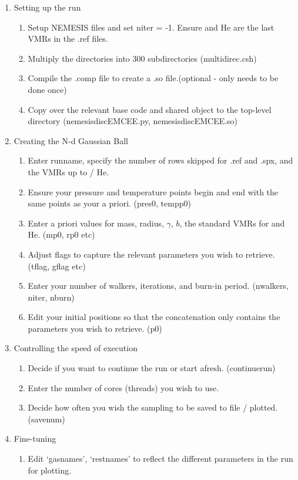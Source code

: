 \documentclass[11pt, a4paper,titlepage]{report}
\begin{document}
\begin{enumerate}
\item Setting up the run
\begin{enumerate}
\item Setup NEMESIS files and set niter = -1. Ensure  and He are the last VMRs in the .ref files.
\item Multiply the directories into 300 subdirectories (multidirec.csh)
\item Compile the .comp file to create a .so file.(optional - only needs to be done once)
\item Copy over the relevant base code and shared object to the top-level directory (nemesisdiscEMCEE.py, nemesisdiscEMCEE.so)
\end{enumerate}
\item{Creating the N-d Gaussian Ball}
\begin{enumerate}
\item Enter runname, specify the number of rows skipped for .ref and .spx, and the VMRs up to  / He. 
\item Ensure your pressure and temperature points begin and end with the same points as your a priori. (pres0, tempp0)
\item Enter a priori values for mass, radius, $\gamma$, $b$, the standard VMRs for  and He. (mp0, rp0 etc)
\item Adjust flags to capture the relevant parameters you wish to retrieve.(tflag, gflag etc)
\item Enter your number of walkers, iterations, and burn-in period. (nwalkers, niter, nburn)
\item Edit your initial positions so that the concatenation only contains the parameters you wish to retrieve. (p0)
\end{enumerate}
\item Controlling the speed of execution
\begin{enumerate}
\item Decide if you want to continue the run or start afresh. (continuerun)
\item Enter the number of cores (threads) you wish to use.
\item Decide how often you wish the sampling to be saved to file / plotted. (savenum)
\end{enumerate}
\item Fine-tuning
\begin{enumerate}
\item Edit `gasnames', `restnames' to reflect the different parameters in the run for plotting.

\end{enumerate}
\end{enumerate}
\end{document}
